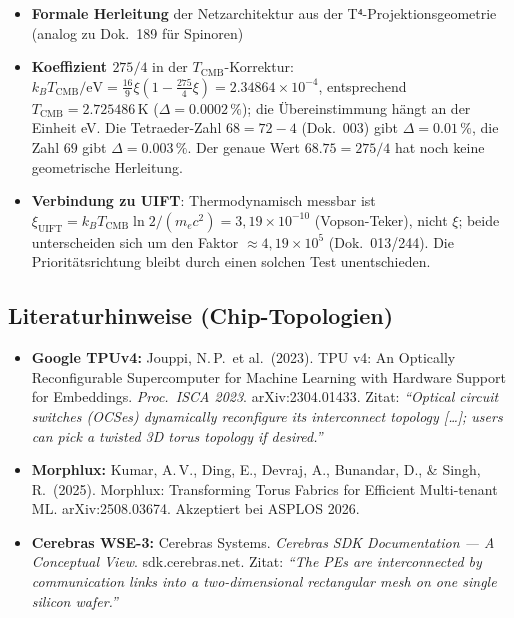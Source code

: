 \begin{itemize}
  \item \textbf{Formale Herleitung} der Netzarchitektur aus der
        T⁴-Projektionsgeometrie (analog zu Dok.~189 für Spinoren)

  \item \textbf{Koeffizient $275/4$} in der $T_\text{CMB}$-Korrektur:
        $k_BT_\text{CMB}/\text{eV} = \tfrac{16}{9}\xi(1 - \tfrac{275}{4}\xi) = 2.34864\times10^{-4}$,
        entsprechend $T_\text{CMB} = 2.725486\,\text{K}$ ($\Delta = 0.0002\,\%$);
        die Übereinstimmung hängt an der Einheit eV. Die Tetraeder-Zahl $68 = 72-4$ (Dok.~003) gibt
        $\Delta = 0.01\,\%$, die Zahl $69$ gibt $\Delta = 0.003\,\%$.
        Der genaue Wert $68.75 = 275/4$ hat noch keine geometrische Herleitung.

  \item \textbf{Verbindung zu UIFT}: Thermodynamisch messbar ist
        $\xi_\text{UIFT} = k_BT_\text{CMB}\ln2/(m_ec^2) = 3{,}19\times10^{-10}$
        (Vopson-Teker), nicht $\xi$; beide unterscheiden sich um den Faktor
        $\approx 4{,}19\times10^{5}$ (Dok.~013/244). Die Prioritätsrichtung
        bleibt durch einen solchen Test unentschieden.
\end{itemize}

\subsection*{Literaturhinweise (Chip-Topologien)}

\begin{itemize}\small
  \item \textbf{Google TPUv4:} Jouppi, N.\,P.\ et al.\ (2023).
        TPU v4: An Optically Reconfigurable Supercomputer for Machine
        Learning with Hardware Support for Embeddings.
        \textit{Proc.\ ISCA 2023}. arXiv:2304.01433.
        Zitat: \textit{``Optical circuit switches (OCSes) dynamically
        reconfigure its interconnect topology [\ldots]; users can pick
        a twisted 3D torus topology if desired.''}

  \item \textbf{Morphlux:} Kumar, A.\,V., Ding, E., Devraj, A.,
        Bunandar, D., \& Singh, R.\ (2025).
        Morphlux: Transforming Torus Fabrics for Efficient
        Multi-tenant ML. arXiv:2508.03674. Akzeptiert bei ASPLOS 2026.

  \item \textbf{Cerebras WSE-3:} Cerebras Systems.
        \textit{Cerebras SDK Documentation --- A Conceptual View}.
        sdk.cerebras.net. Zitat: \textit{``The PEs are interconnected
        by communication links into a two-dimensional rectangular
        mesh on one single silicon wafer.''}
\end{itemize}


